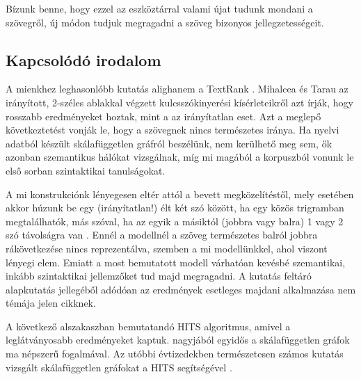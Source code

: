 \documentclass{llncs}
\newcommand{\nyil}{$\rightarrow$\ }
\newcommand{\embf}[1]{\textbf{#1}}
\newcommand{\XXX}[1]{{\small \color{megjcolor} [XXX #1]}}
\newcommand{\XXXb}[1]{\XXX{\embf{#1}}}
\begin{document}
Bízunk benne, hogy ezzel az eszköztárral
valami újat tudunk mondani a szövegről,
új módon tudjuk megragadni a szöveg bizonyos jellegzetességeit.

\subsection{Kapcsolódó irodalom}


A mienkhez leghasonlóbb kutatás alighanem a TextRank \cite{mihalcea2004textrank}.
Mihalcea és Tarau az irányított, 2-széles ablakkal végzett kulcsszókinyerési
kísérleteikről azt
írják, hogy rosszabb eredményeket hoztak, mint a az irányítatlan eset. Azt a
meglepő következtetést vonják le, hogy a szövegnek nincs természetes iránya.
Ha nyelvi adatból készült skálafüggetlen gráfról beszélünk, nem kerülhető meg
\cite{steyvers2005large} sem, ők azonban szemantikus hálókat vizsgálnak, míg mi
magából a korpuszból vonunk le első sorban szintaktikai tanulságokat.

A mi konstrukciónk lényegesen eltér attól a bevett megközelítéstől,
mely esetében akkor húzunk be egy (irányítatlan!) élt
két szó között, ha egy közös trigramban megtalálhatók,
más szóval, ha az egyik a másiktól (jobbra vagy balra)
1 vagy 2 szó távolságra van
\cite{cancho2001thesmall}.
Ennél a modellnél a szöveg természetes balról jobbra rákövetkezése
nincs reprezentálva,
szemben a mi modellünkkel, ahol viszont lényegi elem.
%
Emiatt a most bemutatott modell várhatóan kevésbé szemantikai,
inkább szintaktikai jellemzőket tud majd megragadni.
%
A kutatás feltáró alapkutatás jellegéből adódóan
az eredmények esetleges majdani alkalmazása nem témája jelen cikknek.

A következő alszakaszban bemutatandó HITS algoritmus, amivel a leglátványosabb
eredményeket kaptuk.  nagyjából egyidős a skálafüggetlen gráfok ma népszerű
fogalmával.  Az utóbbi évtizedekben természetesen számos kutatás vizsgált
skálafüggetlen gráfokat a HITS segítségével \cite{zhang2007expertise}.
\end{document}
